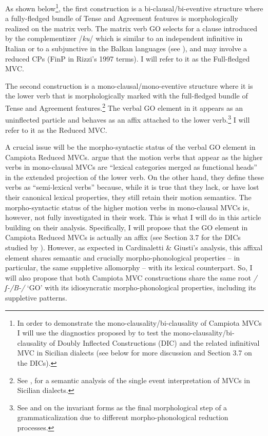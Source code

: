 \documentclass[output=paper]{langscibook}
\begin{document}
As shown below\footnote{In order to demonstrate the mono-clausality/bi-clausality of Campiota MVCs I will use the diagnostics proposed by \citet{cardinaletti2003a} to test the mono-clausality/bi-clausality of Doubly Inflected Constructions (DIC) and the related infinitival MVC in Sicilian dialects (see below for more discussion and Section 3.7 on the DICs).},  the first construction is a bi-clausal/bi-eventive structure where a fully-fledged bundle of Tense and Agreement features is morphologically realized on the matrix verb. The matrix verb GO selects for a clause introduced by the complementizer /\textit{ku}/ which is similar to an independent infinitive in Italian or to a subjunctive in the Balkan languages (see \citealt{calabrese1993a}), and may involve a reduced CPs (FinP in Rizzi’s 1997 terms).  I will refer to it as the Full-fledged MVC.

The second construction is a mono-clausal/mono-eventive structure where it is the lower verb that is morphologically marked with the full-fledged bundle of Tense and Agreement features.\footnote{See \citet{prete2020a}, \citet{todaro2018a} for a semantic analysis of the single event interpretation of MVCs in Sicilian dialects.}  The verbal GO element in it appears as an uninflected particle and behaves as an affix attached to the lower verb.\footnote{See \citet{cruschina2013a, cruschina2021a} and \citet{ledgeway2016a} on the invariant forms as the final morphological step of a grammaticalization due to different morpho-phonological reduction processes.}  I will refer to it as the Reduced MVC.

A crucial issue will be the morpho-syntactic status of the verbal GO element in Campiota Reduced MVCs. \citet{cardinaletti2003a} argue that the motion verbs that appear as the higher verbs in mono-clausal MVCs are “lexical categories merged as functional heads” in the extended projection of the lower verb. On the other hand, they define these verbs as “semi-lexical verbs” because, while it is true that they lack, or have lost their canonical lexical properties, they still retain their motion semantics. The morpho-syntactic status of the higher motion verbs in mono-clausal MVCs is, however, not fully investigated in their work.  This is what I will do in this article building on their analysis.  Specifically, I will propose that the GO element in Campiota Reduced MVCs is actually an affix (see Section 3.7 for the DICs studied by \citet{cardinaletti2003a}). However, as expected in Cardinaletti \& Giusti’s analysis, this affixal element shares semantic and crucially morpho-phonological properties -- in particular, the same suppletive allomorphy --  with its lexical counterpart.  So, I will also propose that both Campiota MVC constructions share the same root \textit{/ʃ-/B-/} ‘GO’ with its idiosyncratic morpho-phonological properties, including its suppletive patterns.
\end{document}

